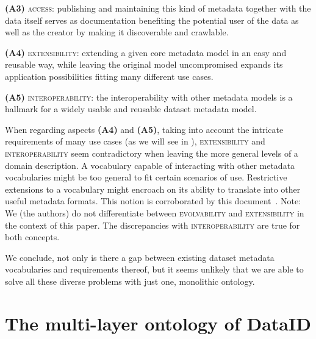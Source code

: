 \documentclass[runningheads,a4paper]{llncs}
\newcommand{\access}{{\scshape access}\xspace}
\newcommand{\extensibility}{{\scshape extensibility}\xspace}
\newcommand{\interoperability}{{\scshape interoperability}\xspace}
\newcommand{\evolvability}{{\scshape evolvability}\xspace}
\begin{document}
\textbf{(A3)} \access: publishing and maintaining
this kind of metadata together with the data itself serves as
documentation benefiting the potential user
of the data as well as the creator by making it discoverable
and crawlable.

\textbf{(A4)} \extensibility: extending a given core metadata model
in an easy and reusable way, while leaving the original model uncompromised expands its application possibilities fitting many
different use cases.

\textbf{(A5)} \interoperability: the interoperability with other metadata models is a hallmark for a widely usable and reusable dataset metadata model.

When regarding aspects \textbf{(A4)} and \textbf{(A5)}, taking into account the intricate requirements of many use cases (as we will see in ), \extensibility and \interoperability seem contradictory when leaving the more general levels of a domain description. A vocabulary capable of interacting with other metadata vocabularies might be too general to fit certain scenarios of use. Restrictive extensions to a vocabulary might encroach on its ability to translate into other useful metadata formats. This notion is corroborated by this document~\cite{ivse}. Note: We (the authors) do not differentiate between \evolvability and \extensibility in the context of this paper. The discrepancies with \interoperability are true for both concepts. %

We conclude, not only is there a gap between existing dataset metadata vocabularies and requirements thereof, but it seems unlikely that we are able to solve all these diverse problems with just one, monolithic ontology.



\section{The multi-layer ontology of DataID} %
\label{dataid}
\end{document}
